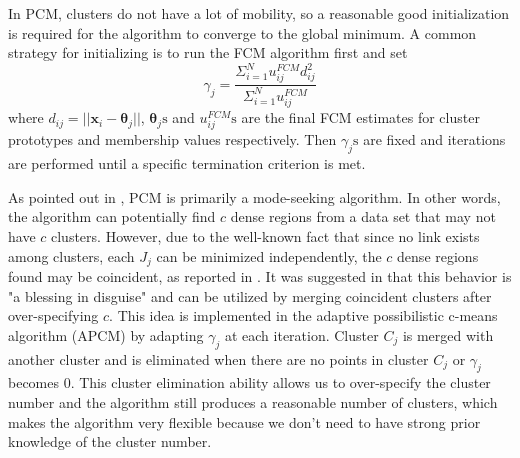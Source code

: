 \documentclass[journal,transmag]{IEEEtran}
\begin{document}
In PCM, clusters do not have a lot of mobility, so a reasonable good initialization is required for the algorithm to converge to the global minimum. A common strategy for initializing is to run the FCM algorithm first and set
\begin{equation}
\gamma_j=\frac{\Sigma_{i=1}^Nu_{ij}^{FCM}d^2_{ij}}{\Sigma_{i=1}^Nu_{ij}^{FCM}}
\end{equation}
where $d_{ij}=||\mathbf{x}_i-\boldsymbol{\theta}_j||$, $\boldsymbol{\theta}_j\text{s}$ and $u_{ij}^{FCM}\text{s}$ are the final FCM estimates for cluster prototypes and membership values respectively. Then $\gamma_j\text{s}$ are fixed and iterations are performed until a specific termination criterion is met.

As pointed out in \cite{krishnapuram_possibilistic_1996}, PCM is primarily a mode-seeking algorithm. In other words, the algorithm can potentially find $c$ dense regions from a data set that may not have $c$ clusters. However, due to the well-known fact that since no link exists among clusters, each $J_j$ can be minimized independently, the $c$ dense regions found may be coincident, as reported in \cite{barni_comments_1996}. It was suggested in \cite{krishnapuram_possibilistic_1996} that this behavior is "a blessing in disguise" and can be utilized by merging coincident clusters after over-specifying $c$. This idea is implemented in the adaptive possibilistic c-means algorithm (APCM) \cite{xenaki_novel_2016} by adapting $\gamma_j$ at each iteration. Cluster $C_j$ is merged with another cluster and is eliminated when there are no points in cluster $C_j$ or $\gamma_j$ becomes $0$. This cluster elimination ability allows us to over-specify the cluster number and the algorithm still produces a reasonable number of clusters, which makes the algorithm very flexible because we don't need to have strong prior knowledge of the cluster number.
\end{document}
